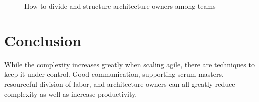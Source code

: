\documentclass[sigplan,screen]{acmart}
\begin{document}
\begin{figure}[!htb]
        \caption{\label{fig:label1} How to divide and structure architecture owners among teams \cite{WAmbler}}
\end{figure}

\section{Conclusion}
While the complexity increases greatly when scaling agile, there are techniques to keep it under control. Good communication, supporting scrum masters, resourceful division of labor, and architecture owners can all greatly reduce complexity as well as increase productivity.



\end{document}
